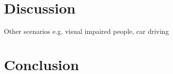 \documentclass{article}
\begin{document}
\section{Discussion}
Other scenarios e.g. visual impaired people, car driving


\section{Conclusion}



\clearpage



\end{document}

